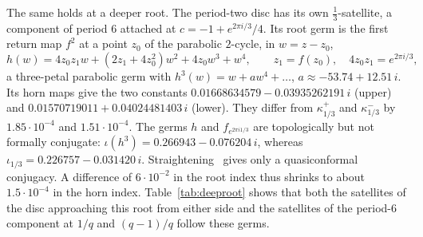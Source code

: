 \documentclass[11pt]{amsart}
\theoremstyle{definition}
\theoremstyle{remark}
\newcommand{\fa}[1]{f_{e^{2\pi i#1}}}
\begin{document}
The same holds at a deeper root. The period-two disc has its own $\frac13$-satellite, a component of period $6$ attached at $c=-1+e^{2\pi i/3}/4$. Its root germ is the first return map $f^2$ at a point $z_0$ of the parabolic $2$-cycle, in $w=z-z_0$,
\[
h(w)=4z_0z_1w+(2z_1+4z_0^2)w^2+4z_0w^3+w^4,\qquad z_1=f(z_0),\quad 4z_0z_1=e^{2\pi i/3},
\]
a three-petal parabolic germ with $h^3(w)=w+aw^4+\dots$, $a\approx-53.74+12.51\,i$. Its horn maps give the two constants $0.01668634579-0.03935262191\,i$ (upper) and $0.01570719011+0.04024481403\,i$ (lower). They differ from $\kappa^+_{1/3}$ and $\kappa^-_{1/3}$ by $1.85\cdot10^{-4}$ and $1.51\cdot10^{-4}$. The germs $h$ and $\fa{1/3}$ are topologically but not formally conjugate: $\iota(h^3)=0.266943-0.076204\,i$, whereas $\iota_{1/3}=0.226757-0.031420\,i$. Straightening~\cite{DH} gives only a quasiconformal conjugacy. A difference of $6\cdot10^{-2}$ in the root index thus shrinks to about $1.5\cdot10^{-4}$ in the horn index. Table~\ref{tab:deeproot} shows that both the satellites of the disc approaching this root from either side and the satellites of the period-$6$ component at $1/q$ and $(q-1)/q$ follow these germs.

\begin{table}[t]
\centering\footnotesize

\caption{The period-two disc near its root against the cardioid near its $\frac12$-root. The disc column uses $[0;N,\tau]$ in the multiplier of the $2$-cycle, the cardioid column $[0;1,1,N-1,\tau]$. Both are extrapolated by polynomials of degree three in $1/q$, from $N=128,\dots,2048$ for $\kappa$ and from $N=256,\dots,4096$ for $G$.}\label{tab:diskroot}
\end{table}

\begin{table}[t]
\centering\scriptsize

\caption{Satellites of the period-three component $W_{1/3}$ (multiplier of the $3$-cycle) against the parabolic renormalizations $\mathcal P^\pm_{1/3}$ of $e^{2\pi i/3}z+z^2$ at its root. Angles $[0;N,\tau]$ (upper) and $1-[0;N,\tau]$ (lower), $q=p_\tau N+r_\tau$. The bulb values are extrapolated from $N=128,\dots,2048$ ($\kappa$) and $256,\dots,4096$ ($G$) by polynomials of degree three in $1/q$. Degree two changes them by at most $5\cdot10^{-8}$ ($\kappa$) and $2.2\cdot10^{-7}$ ($G$).}\label{tab:period3}
\end{table}

\begin{table}[t]
\centering\scriptsize

\caption{A deeper root: the $\frac13$-root of the period-two disc, where the germ is the first return map $f^2$ (three petals). Satellites of the disc approaching it from above ($[0;2,1,N]$) and below ($[0;3,N]$), and satellites of the period-$6$ component attached there, against the upper and lower horn maps of that germ. Extrapolated from $q$ or $N=128,\dots,2048$ by polynomials of degree three; degree two changes the values by at most $1.6\cdot10^{-7}$.}\label{tab:deeproot}
\end{table}
\end{document}
